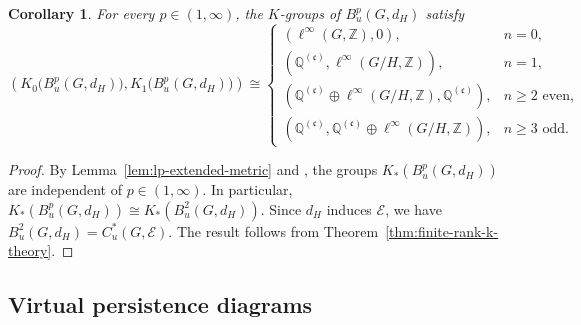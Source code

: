\documentclass[pdflatex,sn-mathphys-num]{sn-jnl}%
\theoremstyle{plain}
\newtheorem{corollary}[theorem]{Corollary}
\theoremstyle{remark}
\theoremstyle{definition}
\numberwithin{equation}{section}
\begin{document}
\begin{corollary}
\label{cor:lp-uniform-roe}
For every \( p\in(1,\infty) \), the \( K \)-groups of \( B_u^p(G,d_H) \) satisfy
\[
\left(
K_0\bigl(B_u^p(G,d_H)\bigr),
K_1\bigl(B_u^p(G,d_H)\bigr)
\right)
\cong
\begin{cases}
\left(
\ell^\infty(G,\mathbb Z),
0
\right),
& n=0,\\[1ex]
\left(
\mathbb Q^{(\mathfrak c)},
\ell^\infty(G/H,\mathbb Z)
\right),
& n=1,\\[1ex]
\left(
\mathbb Q^{(\mathfrak c)}
\oplus
\ell^\infty(G/H,\mathbb Z),
\mathbb Q^{(\mathfrak c)}
\right),
& n\geq2 \text{ even},\\[1ex]
\left(
\mathbb Q^{(\mathfrak c)},
\mathbb Q^{(\mathfrak c)}
\oplus
\ell^\infty(G/H,\mathbb Z)
\right),
& n\geq3 \text{ odd}.
\end{cases}
\]
\end{corollary}

\begin{proof}
By Lemma~\ref{lem:lp-extended-metric} and \cite[Corollary~5.9]{austad2025polynomial}, the groups \( K_*(B_u^p(G,d_H)) \) are independent of \( p\in(1,\infty) \). In particular, \( K_*(B_u^p(G,d_H))\cong K_*(B_u^2(G,d_H)) \). Since \( d_H \) induces \( \mathcal E \), we have \( B_u^2(G,d_H)=C_u^*(G,\mathcal E) \). The result follows from Theorem~\ref{thm:finite-rank-k-theory}.
\end{proof}

\subsection{Virtual persistence diagrams}
\end{document}
